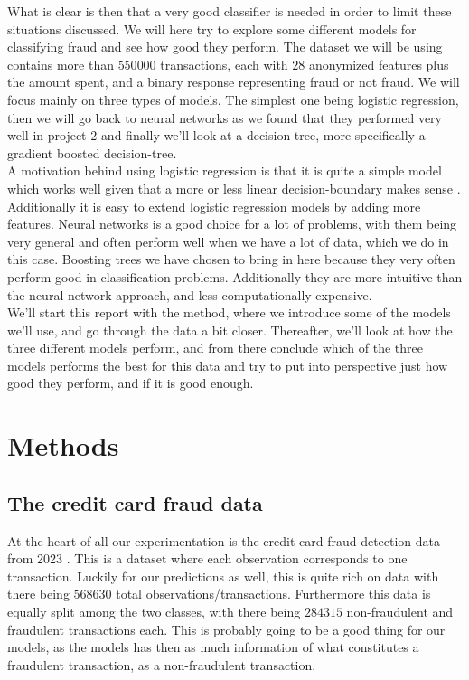 \documentclass{article}
\begin{document}
What is clear is then that a very good classifier is needed in order to limit
these situations discussed. We will here try to explore some different models
for classifying fraud and see how good they perform. The dataset we will be
using contains more than $550 000$ transactions, each with $28$ anonymized
features plus the amount spent, and a binary response representing fraud or not
fraud. We will focus mainly on three types of models. The simplest one being
logistic regression, then we will go back to neural networks as we found that
they performed very well in project 2 \cite{githubrepoproject2} and finally
we'll look at a decision tree, more specifically a gradient boosted
decision-tree.
\\

A motivation behind using logistic regression is that it is quite a simple model
which works well given that a more or less linear decision-boundary makes sense
\cite[s.~4.1]{hastie2009elements}. Additionally it is easy to extend logistic
regression models by adding more features. Neural networks is a good choice for
a lot of problems, with them being very general and often perform well when we
have a lot of data, which we do in this case.  Boosting trees we have chosen to
bring in here because they very often perform good in classification-problems.
Additionally they are more intuitive than the neural network approach, and less
computationally expensive.
\\

We'll start this report with the method, where we introduce some of the models
we'll use, and go through the data a bit closer. Thereafter, we'll look at how
the three different models perform, and from there conclude which of the three
models performs the best for this data and try to put into perspective just how
good they perform, and if it is good enough.

\section{Methods}
\subsection{The credit card fraud data}
\label{methoddata}
At the heart of all our experimentation is the credit-card fraud detection
data from 2023 \cite{kaggleccdata}. This is a dataset where each observation
corresponds to one transaction. Luckily for our predictions as well, this is
quite rich on data with there being $568630$ total observations/transactions.
Furthermore this data is equally split among the two classes, with there being
$284315$ non-fraudulent and fraudulent transactions each. This is probably
going to be a good thing for our models, as the models has then as much
information of what constitutes a fraudulent transaction, as a non-fraudulent
transaction.
\end{document}
